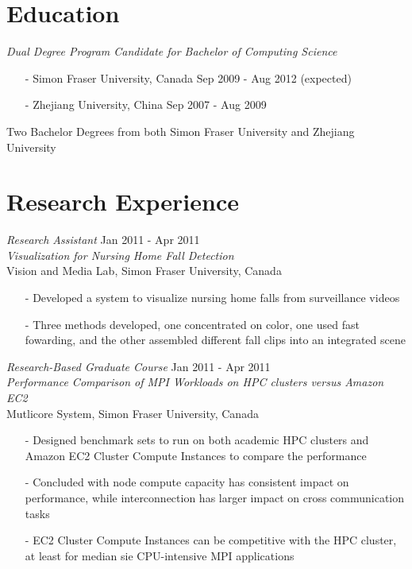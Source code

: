 \documentclass[line,margin]{res}
\begin{document}
\address{7309 Montclair St, Burnaby, BC, Canada, V5A 3J2}
\address{+1-778-881-3070 \\jias@sfu.ca}

\begin{resume}

\section{Education} 
    {\sl Dual Degree Program Candidate for Bachelor of Computing Science}  
      \begin{itemize} \itemsep -2pt
        \item[-] Simon Fraser University, Canada \hfill Sep 2009 - Aug 2012 (expected)
        \item[-] Zhejiang University, China \hfill Sep 2007 - Aug 2009
      \end{itemize}
	  \vspace{-1.1em}
      Two Bachelor Degrees from both Simon Fraser University and Zhejiang University

\section{Research Experience}
    {\sl Research Assistant} \hfill Jan 2011 - Apr 2011 \\
	{\sl Visualization for Nursing Home Fall Detection}\\
	Vision and Media Lab, Simon Fraser University, Canada
	\begin{itemize} \itemsep -2pt
	    \item[-] Developed a system to visualize nursing home falls from surveillance videos
		\item[-] Three methods developed, one concentrated on color, one used fast fowarding, and the other assembled different fall clips into an integrated scene
	\end{itemize}

	{\sl Research-Based Graduate Course} \hfill Jan 2011 - Apr 2011 \\
	{\sl Performance Comparison of MPI Workloads on HPC clusters versus Amazon EC2} \\
	Mutlicore System, Simon Fraser University, Canada
	\begin{itemize} \itemsep -2pt
	    \item[-] Designed benchmark sets to run on both academic HPC clusters and Amazon EC2 Cluster Compute Instances to compare the performance
		\item[-] Concluded with node compute capacity has consistent impact on performance, while interconnection has larger impact on cross communication tasks
		\item[-] EC2 Cluster Compute Instances can be competitive with the HPC cluster, at least for median sie CPU-intensive MPI applications
	\end{itemize}


\end{resume}
\end{document}
